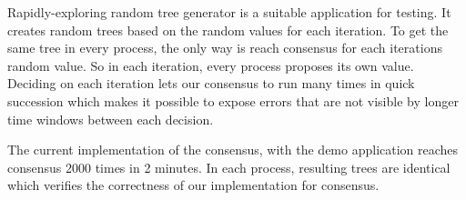 \documentclass[times, 12pt,twocolumn]{article}
\begin{document}
Rapidly-exploring random tree generator is a suitable application for testing. It creates random trees based on the random values for each iteration. To get the same tree in every process, the only way is reach consensus for each iterations random value. So in each iteration, every process proposes its own value. Deciding on each iteration lets our consensus to run many times in quick succession which makes it possible to expose errors that are not visible by longer time windows between each decision.
 



The current implementation of the consensus, with the demo application reaches consensus 2000 times in 2 minutes. In each process, resulting trees are identical which verifies the correctness of our implementation for consensus. %




\end{document}
